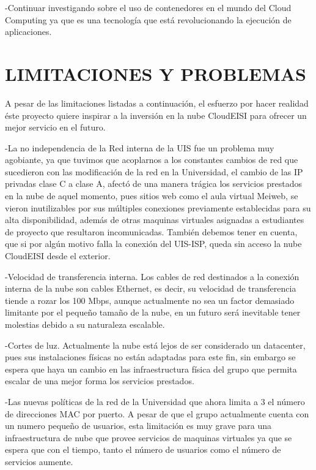     
    -Continuar investigando sobre el uso de contenedores en el mundo del Cloud Computing ya que es una tecnología que está revolucionando la ejecución de aplicaciones.
    
    
    
    \newpage\chapter{LIMITACIONES Y PROBLEMAS} 
    
    A pesar de las limitaciones listadas  a continuación, el esfuerzo por hacer realidad éste proyecto quiere inspirar a la inversión en la nube CloudEISI para ofrecer un mejor servicio en el futuro.
    
    -La no independencia de la Red interna de la UIS fue un problema muy agobiante,  ya que tuvimos que acoplarnos a los constantes cambios de red que sucedieron con las modificación de la red en la Universidad, el cambio de  las IP privadas clase C  a clase A, afectó de una manera trágica los servicios prestados en la nube de aquel momento, pues sitios web como el aula virtual Meiweb, se vieron inutilizables por sus múltiples conexiones previamente establecidas para su alta disponibilidad, además de otras maquinas virtuales asignadas a estudiantes de proyecto que resultaron incomunicadas. También debemos tener en cuenta, que si por algún motivo falla la conexión del UIS-ISP, queda sin acceso la nube CloudEISI desde el exterior.
    
    -Velocidad de transferencia interna. Los cables de red destinados a la conexión interna de la nube son cables Ethernet, es decir, su velocidad de transferencia tiende a rozar los 100 Mbps, aunque actualmente no sea un factor demasiado limitante por el pequeño tamaño de la nube, en un futuro será inevitable tener molestias debido a su naturaleza escalable.
    
    -Cortes de luz. Actualmente la nube está lejos de ser considerado un datacenter, pues sus instalaciones físicas no están adaptadas para este fin, sin embargo se espera que haya un cambio en las infraestructura física del grupo que permita escalar de una mejor forma los servicios prestados.
    
    -Las nuevas políticas de la red de la Universidad que ahora limita a 3 el número de direcciones MAC por puerto. A pesar de que el grupo actualmente cuenta con un numero pequeño de usuarios, esta limitación es muy grave para una infraestructura de nube que provee servicios de maquinas virtuales ya que se espera que con el tiempo, tanto el número de usuarios como el número de servicios aumente.
    
